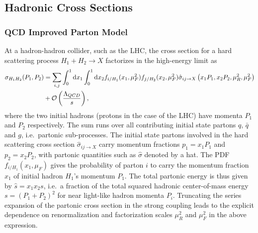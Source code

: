\subsection{Hadronic Cross Sections}
\subsubsection{QCD Improved Parton Model}
\label{sec:partonmodel}
 At a hadron-hadron collider, such as the LHC, the cross section for a hard scattering process $H_1+H_2\rightarrow
X$ factorizes in the high-energy limit as
\begin{align}
\label{eq:factorization}
  \sigma_{H_1 H_2}(P_1,P_2) &= \sum_{i,j}\int_0^1\dd x_1 \int_0^1 \dd
  x_2f_{i/H_1}(x_1,\mu_F^2)f_{j/H_2}(x_2,\mu_F^2)\hat \sigma_{ij\rightarrow
    X}\left(x_1 P_1,x_2 P_2,\mu_R^2,{\mu_F^2}\right) \notag \\
&+\mathcal{O}\left(\frac{\Lambda_{QCD}}{s}\right),
\end{align}
where the two initial hadrons (protons in the case of the LHC) have momenta $P_1$ and $P_2$
respectively. The sum runs over all contributing initial state
partons $q$, $\bar{q}$ and $g$, i.e.\ partonic
sub-processes. The initial state partons involved in the hard
scattering cross section $\hat \sigma_{ij\rightarrow
  X}$ carry
momentum fractions $p_1=x_1P_1$ and $p_2=x_2P_2$, with partonic
quantities such as $\hat \sigma$ denoted by a hat. The PDF $f_{i/H_1}(x_1,\mu_F)$ gives the probability of parton
$i$ to carry the momentum fraction $x_1$ of initial hadron $H_1$'s
momentum $P_1$. The total partonic energy is
thus given by $\hat s=x_1x_2 s$, i.e.\ a fraction of the total squared hadronic
center-of-mass energy $s=(P_1+P_2)^2$ for near light-like hadron momenta $P_i$. Truncating the series
expansion of the partonic cross section in the strong coupling leads to the explicit dependence on renormalization and
factorization scales $\mu_R^2$ and $\mu_F^2$ in the above expression.


